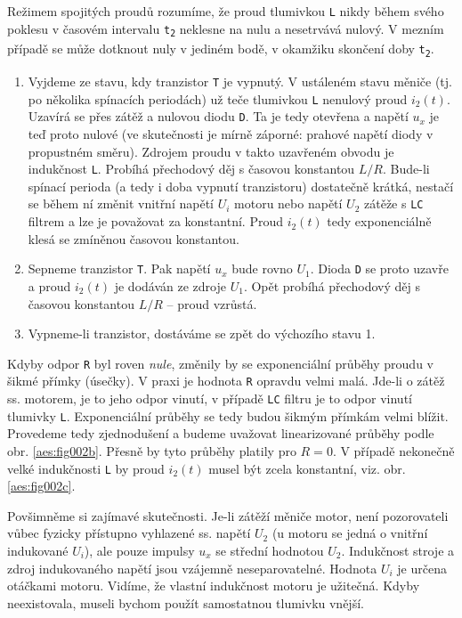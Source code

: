 {      Režimem spojitých proudů rozumíme, že proud tlumivkou \texttt{L} nikdy během svého poklesu v 
      časovém intervalu \texttt{t\textsubscript{2}} neklesne na nulu a nesetrvává nulový. V mezním 
      případě se může dotknout nuly v jediném bodě, v okamžiku skončení doby 
      \texttt{t\textsubscript{2}}.
      \begin{enumerate}
        \item Vyjdeme ze stavu, kdy tranzistor \texttt{T} je vypnutý. V ustáleném stavu měniče (tj. 
              po několika spínacích periodách) už teče tlumivkou \texttt{L} nenulový proud 
              \(i_2(t)\). Uzavírá se přes zátěž a nulovou diodu \texttt{D}. Ta je tedy otevřena a 
              napětí \(u_x\) je teď proto nulové (ve skutečnosti je mírně záporné: prahové napětí 
              diody v propustném směru). Zdrojem proudu v takto uzavřeném obvodu je indukčnost 
              \texttt{L}. Probíhá přechodový děj s časovou konstantou \(L/R\). Bude-li spínací 
              perioda (a tedy i doba vypnutí tranzistoru) dostatečně krátká, nestačí se během ní 
              změnit vnitřní napětí \(U_i\) motoru nebo napětí \(U_2\) zátěže s \texttt{LC} filtrem 
              a lze je považovat za konstantní. Proud \(i_2(t)\) tedy exponenciálně klesá se 
              zmíněnou časovou konstantou.
        \item Sepneme tranzistor \texttt{T}. Pak napětí \(u_x\) bude rovno \(U_1\). Dioda 
              \texttt{D} se proto uzavře a proud \(i_2(t)\) je dodáván ze zdroje \(U_1\). Opět 
              probíhá přechodový děj s časovou konstantou \(L/R\) – proud vzrůstá.
        \item Vypneme-li tranzistor, dostáváme se zpět do výchozího stavu 1.
      \end{enumerate}
      
      Kdyby odpor \texttt{R} byl roven \emph{nule}, změnily by se exponenciální průběhy proudu v 
      šikmé přímky (úsečky). V praxi je hodnota \texttt{R} opravdu velmi malá. Jde-li o zátěž ss. 
      motorem, je to jeho odpor vinutí, v případě \texttt{LC} filtru je to odpor vinutí tlumivky 
      \texttt{L}. Exponenciální průběhy se tedy budou šikmým přímkám velmi blížit. Provedeme tedy 
      zjednodušení a budeme uvažovat linearizované průběhy podle obr. \ref{aes:fig002b}.
      Přesně by tyto průběhy platily pro \(R = 0\). V případě nekonečně velké indukčnosti 
      \texttt{L} by proud \(i_2(t)\) musel být zcela konstantní, viz. obr. \ref{aes:fig002c}.
      
      \begin{note}
        Povšimněme si zajímavé skutečnosti. Je-li zátěží měniče motor, není pozorovateli vůbec 
        fyzicky přístupno vyhlazené ss. napětí \(U_2\) (u motoru se jedná o vnitřní indukované 
        \(U_i\)), ale pouze impulsy \(u_x\) se střední hodnotou \(U_2\). Indukčnost stroje a zdroj 
        indukovaného napětí jsou vzájemně neseparovatelné. Hodnota \(U_i\) je určena otáčkami 
        motoru. Vidíme, že vlastní indukčnost motoru je užitečná. Kdyby neexistovala, museli bychom 
        použít samostatnou tlumivku vnější.
      \end{note}
      
}
